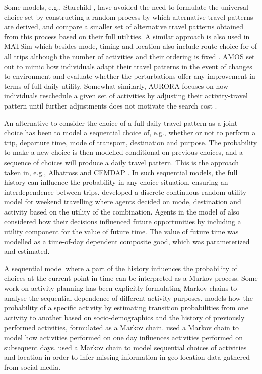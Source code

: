 Some models, e.g.,  Starchild \citep{recker86starchild1,recker86starchild2}, have avoided the need to formulate the universal choice set by constructing a random process by which alternative travel patterns are derived, and compare a smaller set of alternative travel patterns obtained from this process based on their full utilities.  
A similar approach is also used in MATSim which besides mode, timing and location also include route choice for of all trips although the number of activities and their ordering is fixed  \citep{lefebvre2007fast,grether2009mode,balmer05,horni2012high}.  AMOS \citep{kitamura1996Sams} set out to mimic how individuals adapt their travel patterns in the event of changes to environment and evaluate whether the perturbations offer any improvement in terms of full daily utility. Somewhat similarly, AURORA focuses on how individuals reschedule a given set of activities by adjusting their activity-travel pattern until further adjustments does not motivate the search cost \citep{timmermans2001modeling,joh2003Aurora, johEstimationAurora2005}.

An alternative to consider the choice of a full daily travel pattern as a joint choice has been to model a sequential choice of, e.g., whether or not to perform a trip, departure time, mode of transport, destination and purpose. The probability to make a new choice is then modelled conditional on previous choices, and a sequence of choices will produce a daily travel pattern. This is the approach taken in, e.g., Albatross \citep{timmermans2001modeling} and CEMDAP \citep{bhat2004comprehensive}. In such sequential models, the full history can influence the probability in any choice situation, ensuring an interdependence between trips. \citet{Habib11RUM} developed a discrete-continuous random utility model for weekend travelling where agents decided on mode, destination and activity based on the utility of the combination. Agents in the model of \citet{Habib11RUM} also considered how their decisions influenced future opportunities by including a utility component for the value of future time. The value of future time was modelled as a time-of-day dependent composite good, which was parameterized and estimated. 

A sequential model where a part of the history influences the probability of choices at the current point in time can be interpreted as a Markov process. Some work on activity planning has been explicitly formulating Markov chains to analyse the sequential dependence of different activity purposes. \citet{AllahviranlooMDP13} models how the probability of a specific activity by estimating transition probabilities from one activity to another based on socio-demographics and the history of previously performed activities, formulated as a Markov chain. \citet{susilo2014repetitions} used a Markov chain to model how activities performed on one day influences activities performed on subsequent days. \citet{hasan18} used a Markov chain to model sequential choices of activities and location in order to infer missing information in geo-location data gathered from social media.  


